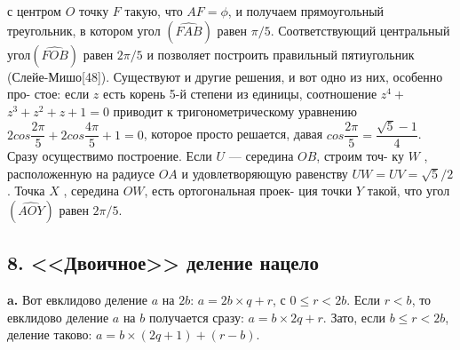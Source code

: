 с центром $O$ точку $F$ такую, что $AF=\phi$, и получаем прямоугольный
треугольник, в котором угол $(\widehat{FAB})$ равен $\pi/5$.\newline
\hspace*{15pt}Соответствующий центральный угол$(\widehat{FOB})$ равен $2\pi/5$ и позволяет\linebreak
построить правильный пятиугольник (Слейе-Мишо[48]).\newline
Существуют и другие решения, и вот одно из них, особенно про-\linebreak
стое: если $z$ есть корень 5-й степени из единицы, соотношение $z^4+$\linebreak
$z^3+z^2+z+1=0$ приводит к тригонометрическому уравнению\linebreak
$2cos\dfrac{2\pi}{5}+2cos\dfrac{4\pi}{5}+1=0$, которое просто решается, давая $cos\dfrac{2\pi}{5}=\dfrac{\sqrt{5}-1}{4}$.\linebreak
Сразу осуществимо построение. Если $U$ — середина $OB$, строим точ-\linebreak
ку $W$ , расположенную на радиусе $OA$ и удовлетворяющую равенству\linebreak
$UW=UV=\sqrt{5}/2$. Точка $X$ , середина $OW$, есть ортогональная проек-\linebreak
ция точки $Y$ такой, что угол $(\widehat{AOY})$ равен $2\pi/5$.
\subsection{8. <<Двоичное>> деление нацело}
\hspace*{15pt}\textbf{a.} Вот евклидово деление $a$ на $2b$: $a=2b\times q+r$, с $0\leqslant r<2b$. Если\linebreak
$r<b$, то евклидово деление $a$ на $b$ получается сразу: $a=b\times 2q+r$. Зато,\linebreak
если $b\leqslant r<2b$, деление таково: $a=b\times(2q+1)+(r-b)$.
\newpage



